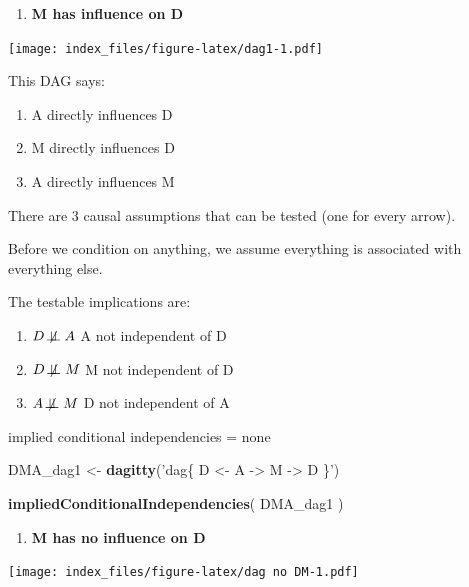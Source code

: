 \documentclass[
]{article}
\newenvironment{Shaded}{\begin{snugshade}}{\end{snugshade}}
\newcommand{\KeywordTok}[1]{\textcolor[rgb]{0.13,0.29,0.53}{\textbf{#1}}}
\newcommand{\NormalTok}[1]{#1}
\newcommand{\StringTok}[1]{\textcolor[rgb]{0.31,0.60,0.02}{#1}}
\providecommand{\tightlist}{%
  \setlength{\itemsep}{0pt}\setlength{\parskip}{0pt}}
\begin{document}
\begin{enumerate}
\def\labelenumi{\arabic{enumi}.}
\tightlist
\item
  \textbf{M has influence on D}
\end{enumerate}

\texttt{[image: index\_files/figure-latex/dag1-1.pdf]}

This DAG says:

\begin{enumerate}
\def\labelenumi{(\arabic{enumi})}
\tightlist
\item
  A directly influences D
\item
  M directly influences D
\item
  A directly influences M
\end{enumerate}

There are 3 causal assumptions that can be tested (one for every arrow).

Before we condition on anything, we assume everything is associated with
everything else.

The testable implications are:

\begin{enumerate}
\def\labelenumi{(\arabic{enumi})}
\tightlist
\item
  \(D \not\!\perp\!\!\!\perp A\) A not independent of D
\item
  \(D \not\!\perp\!\!\!\perp M\) M not independent of D
\item
  \(A \not\!\perp\!\!\!\perp M\) D not independent of A
\end{enumerate}

implied conditional independencies = none

\begin{Shaded}
\begin{Highlighting}[]
\NormalTok{DMA_dag1 <-}\StringTok{ }\KeywordTok{dagitty}\NormalTok{(}\StringTok{'dag\{ D <- A -> M -> D \}'}\NormalTok{)}

\KeywordTok{impliedConditionalIndependencies}\NormalTok{( DMA_dag1  )}
\end{Highlighting}
\end{Shaded}

\begin{enumerate}
\def\labelenumi{\arabic{enumi}.}
\setcounter{enumi}{1}
\tightlist
\item
  \textbf{M has no influence on D}
\end{enumerate}

\texttt{[image: index\_files/figure-latex/dag no DM-1.pdf]}
\end{document}
